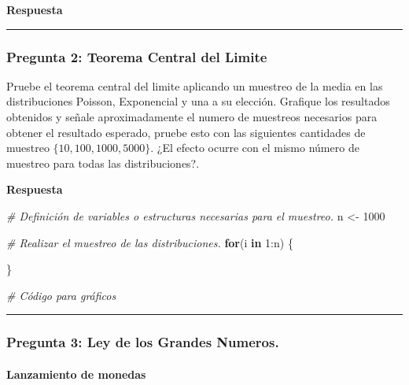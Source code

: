 \documentclass[]{article}
\newenvironment{Shaded}{\begin{snugshade}}{\end{snugshade}}
\newcommand{\CommentTok}[1]{\textcolor[rgb]{0.56,0.35,0.01}{\textit{#1}}}
\newcommand{\ControlFlowTok}[1]{\textcolor[rgb]{0.13,0.29,0.53}{\textbf{#1}}}
\newcommand{\DecValTok}[1]{\textcolor[rgb]{0.00,0.00,0.81}{#1}}
\newcommand{\NormalTok}[1]{#1}
\newcommand{\OtherTok}[1]{\textcolor[rgb]{0.56,0.35,0.01}{#1}}
\newcommand{\SpecialCharTok}[1]{\textcolor[rgb]{0.00,0.00,0.00}{#1}}
\let\oldparagraph\paragraph
\renewcommand{\paragraph}[1]{\oldparagraph{#1}\mbox{}}
\begin{document}
\textbf{Respuesta}

\begin{center}\rule{0.5\linewidth}{0.5pt}\end{center}

\hypertarget{pregunta-2-teorema-central-del-limite}{%
\subsubsection{Pregunta 2: Teorema Central del
Limite}\label{pregunta-2-teorema-central-del-limite}}

Pruebe el teorema central del limite aplicando un muestreo de la media
en las distribuciones Poisson, Exponencial y una a su elección. Grafique
los resultados obtenidos y señale aproximadamente el numero de muestreos
necesarios para obtener el resultado esperado, pruebe esto con las
siguientes cantidades de muestreo \(\{10,100,1000,5000\}\). ¿El efecto
ocurre con el mismo número de muestreo para todas las distribuciones?.

\textbf{Respuesta}

\begin{Shaded}
\begin{Highlighting}[]
\CommentTok{\# Definición de variables o estructuras necesarias para el muestreo.}
\NormalTok{n }\OtherTok{\textless{}{-}} \DecValTok{1000}

\CommentTok{\# Realizar el muestreo de las distribuciones.}
\ControlFlowTok{for}\NormalTok{(i }\ControlFlowTok{in} \DecValTok{1}\SpecialCharTok{:}\NormalTok{n) \{}
  
\NormalTok{\}}

\CommentTok{\# Código para gráficos}
\end{Highlighting}
\end{Shaded}

\begin{center}\rule{0.5\linewidth}{0.5pt}\end{center}

\hypertarget{pregunta-3-ley-de-los-grandes-numeros.}{%
\subsubsection{Pregunta 3: Ley de los Grandes
Numeros.}\label{pregunta-3-ley-de-los-grandes-numeros.}}

\hypertarget{lanzamiento-de-monedas}{%
\paragraph{Lanzamiento de monedas}\label{lanzamiento-de-monedas}}
\end{document}
